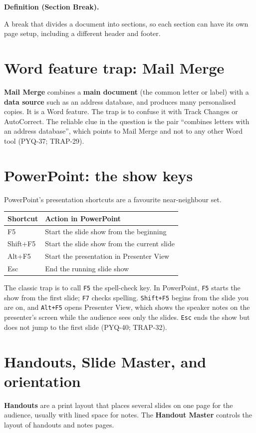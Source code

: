 \documentclass[11pt]{article}
\newenvironment{definitionbox}[1]{%
  \par\noindent\textbf{Definition (#1).}\ \itshape
}{\par\vspace{0.3em}}
\begin{document}
\begin{definitionbox}{Section Break}
A break that divides a document into sections, so each section can have its
own page setup, including a different header and footer.
\end{definitionbox}

\section{Word feature trap: Mail Merge}
\textbf{Mail Merge} combines a \textbf{main document} (the common letter or
label) with a \textbf{data source} such as an address database, and produces
many personalised copies. It is a Word feature. The trap is to confuse it
with Track Changes or AutoCorrect. The reliable clue in the question is the
pair ``combines letters with an address database'', which points to Mail
Merge and not to any other Word tool (PYQ-37; TRAP-29).

\section{PowerPoint: the show keys}
PowerPoint's presentation shortcuts are a favourite near-neighbour set.

\begin{center}
\begin{tabular}{p{}p{}}
\toprule
\textbf{Shortcut} & \textbf{Action in PowerPoint} \\
\midrule
F5 & Start the slide show from the beginning \\
Shift+F5 & Start the slide show from the current slide \\
Alt+F5 & Start the presentation in Presenter View \\
Esc & End the running slide show \\
\bottomrule
\end{tabular}
\end{center}

The classic trap is to call \texttt{F5} the spell-check key. In PowerPoint,
\texttt{F5} starts the show from the first slide; \texttt{F7} checks
spelling. \texttt{Shift+F5} begins from the slide you are on, and
\texttt{Alt+F5} opens Presenter View, which shows the speaker notes on the
presenter's screen while the audience sees only the slides. \texttt{Esc} ends
the show but does not jump to the first slide (PYQ-40; TRAP-32).

\section{Handouts, Slide Master, and orientation}
\textbf{Handouts} are a print layout that places several slides on one page
for the audience, usually with lined space for notes. The \textbf{Handout
Master} controls the layout of handouts and notes pages.
\end{document}
